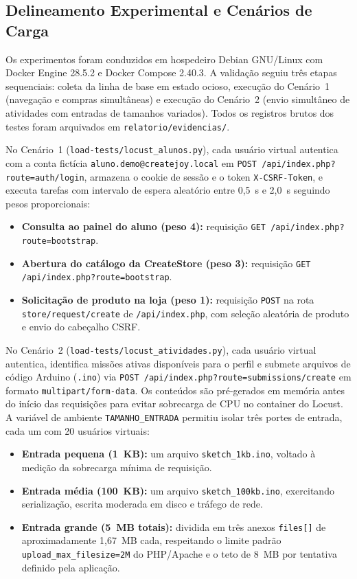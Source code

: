 \documentclass[conference]{IEEEtran}
\begin{document}
\subsection{Delineamento Experimental e Cenários de Carga}
Os experimentos foram conduzidos em hospedeiro Debian GNU/Linux com Docker Engine 28.5.2 e Docker Compose 2.40.3. A validação seguiu três etapas sequenciais: coleta da linha de base em estado ocioso, execução do Cenário~1 (navegação e compras simultâneas) e execução do Cenário~2 (envio simultâneo de atividades com entradas de tamanhos variados). Todos os registros brutos dos testes foram arquivados em \texttt{relatorio/evidencias/}.

No Cenário~1 (\texttt{load-tests/locust\_alunos.py}), cada usuário virtual autentica com a conta fictícia \texttt{aluno.demo@createjoy.local} em \texttt{POST /api/index.php?route=auth/login}, armazena o cookie de sessão e o token \texttt{X-CSRF-Token}, e executa tarefas com intervalo de espera aleatório entre 0,5~s e 2,0~s seguindo pesos proporcionais:
\begin{itemize}
    \item \textbf{Consulta ao painel do aluno (peso 4):} requisição \texttt{GET /api/index.php?route=bootstrap}.
    \item \textbf{Abertura do catálogo da CreateStore (peso 3):} requisição \texttt{GET /api/index.php?route=bootstrap}.
    \item \textbf{Solicitação de produto na loja (peso 1):} requisição \texttt{POST} na rota \texttt{store/request/create} de \texttt{/api/index.php}, com seleção aleatória de produto e envio do cabeçalho CSRF.
\end{itemize}

No Cenário~2 (\texttt{load-tests/locust\_atividades.py}), cada usuário virtual autentica, identifica missões ativas disponíveis para o perfil e submete arquivos de código Arduino (\texttt{.ino}) via \texttt{POST /api/index.php?route=submissions/create} em formato \texttt{multipart/form-data}. Os conteúdos são pré-gerados em memória antes do início das requisições para evitar sobrecarga de CPU no container do Locust. A variável de ambiente \texttt{TAMANHO\_ENTRADA} permitiu isolar três portes de entrada, cada um com 20 usuários virtuais:
\begin{itemize}
    \item \textbf{Entrada pequena (1~KB):} um arquivo \texttt{sketch\_1kb.ino}, voltado à medição da sobrecarga mínima de requisição.
    \item \textbf{Entrada média (100~KB):} um arquivo \texttt{sketch\_100kb.ino}, exercitando serialização, escrita moderada em disco e tráfego de rede.
    \item \textbf{Entrada grande (5~MB totais):} dividida em três anexos \texttt{files[]} de aproximadamente 1,67~MB cada, respeitando o limite padrão \texttt{upload\_max\_filesize=2M} do PHP/Apache e o teto de 8~MB por tentativa definido pela aplicação.
\end{itemize}
\end{document}
